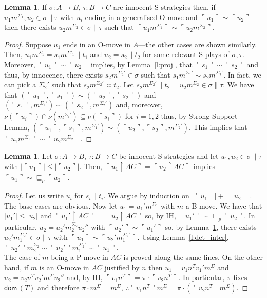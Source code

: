 \documentclass{CSML}
\theoremstyle{definition}\newtheorem{definition}[thm]{Definition}
\theoremstyle{definition}\newtheorem{example}[thm]{Example}
\theoremstyle{definition}\newtheorem{proposition}[thm]{Proposition}
\theoremstyle{definition}\newtheorem{lemma}[thm]{Lemma}
\theoremstyle{definition}\newtheorem{theorem}[thm]{Theorem}
\theoremstyle{definition}\newtheorem{corollary}[thm]{Corollary}
\theoremstyle{definition}\newtheorem{remark}[thm]{Remark}
\renewcommand\Sigma{\varSigma}
\newcommand\Tau{T}
\newcommand\arr{\rightarrow}
\newcommand\rest{\upharpoonright}
\newcommand\iseq{\mathop{\|}}
\newcommand\actn{\cdot}
\newcommand{\HY}{\hspace{2pt}---\hspace{2pt}}
\newcommand\dom[1]{\mathsf{dom}\,#1}
\newcommand\prefix{\sqsubseteq_p}
\newcommand\pview[1]{\ulcorner{#1}\urcorner}
\newcommand\pv[1]{\pview{#1}}
\begin{document}
\begin{lemma}\label{l:inn_inter}
If $\sigma:A\arr B$, $\tau:B\arr C$ are innocent S-strategies then, if $u_1m^{\Sigma_1},u_2\in\sigma\iseq\tau$ with $u_i$ ending in a generalised O-move and $\pv{u_1}\sim\pv{u_2}$ then there exists $u_2m^{\Sigma_2}\in\sigma\iseq\tau$ such that $\pv{u_1m^{\Sigma_1}}\sim\pv{u_2m^{\Sigma_2}}$.
\end{lemma}
\begin{proof}
Suppose $u_1$ ends in an O-move in $A$\HY the other cases are shown similarly. Then, $u_1m^{\Sigma_1}=s_1 m^{\Sigma'_1}\iseq t_1$ and $u_2=s_2\iseq t_2$ for some relevant S-plays of $\sigma,\tau$. Moreover, $\pv{u_1}\sim\pv{u_2}$ implies, by Lemma~\ref{l:proj}, that $\pv{s_1}\sim\pv{s_2}$ and thus, by innocence, there exists $s_2m^{\Sigma_2'}\in\sigma$ such that $s_1m^{\Sigma_1'}\sim s_2m^{\Sigma_2'}$. In fact, we can pick a $\Sigma_2'$ such that $s_2m^{\Sigma_2'}\asymp t_2$. Let $s_2m^{\Sigma_2'}\iseq t_2=u_2m^{\Sigma_2}\in\sigma\iseq\tau$. We have that $(\pv{u_1},\pv{s_1})\sim(\pv{u_2},\pv{s_2})$ and $(\pv{s_1},m^{\Sigma_1'})\sim(\pv{s_2},m^{\Sigma_2'})$ and, moreover, $\nu(\pv{u_i})\cap\nu(m^{\Sigma_i'})\subseteq\nu(\pv{s_i})$ for $i=1,2$ thus, by Strong Support Lemma, $(\pv{u_1},\pv{s_1},m^{\Sigma_1'})\sim(\pv{u_2},\pv{s_2},m^{\Sigma_2'})$. This implies that $\pv{u_1m^{\Sigma_1}}\sim\pv{u_2m^{\Sigma_2}}$.
\end{proof}

\begin{lemma}\label{l:inn_other}
Let $\sigma:A\arr B$, $\tau:B\arr C$ be innocent S-strategies and let $u_1,u_2\in\sigma\iseq\tau$ with $|\pv{u_1}|\leq|\pv{u_2}|$. Then, $\pv{u_1\rest AC}=\pv{u_2\rest AC}$  implies $\pv{u_1}\sim\prefix\pv{u_2}$.
\end{lemma}
\begin{proof}
Let us write $u_i$ for $s_i\iseq t_i$.
We argue by induction on $|\pv{u_1}|+|\pv{u_2}|$. The base cases are obvious.  Now let $u_1=u_1'm^{\Sigma_1}$ with $m$ a B-move. We have that $|u_1'|\leq|u_2|$ and $\pv{u_1'\rest AC}=\pv{u_2\rest AC}$ so, by IH, $\pv{u_1'}\sim\prefix\pv{u_2}$. In particular, $u_2=u_2'm_2^{\Sigma_2}u_2''$ with $\pv{u_2'}\sim\pv{u_1'}$ so, by Lemma~\ref{l:inn_inter}, there exists $u_2'm_1^{\Sigma_2'}\in\sigma\iseq\tau$ with $\pv{u_1}\sim\pv{u_2'm_1^{\Sigma_2'}}$. Using Lemma~\ref{l:det_inter}, $\pv{u_2'}m_2^{\Sigma_2}\sim \pv{u_2'}m_1^{\Sigma_2'}\sim \pv{u_1}$.\\
The case of $m$ being a P-move in $AC$ is proved along the same lines. On the other hand, if $m$ is an O-move in $AC$ justified by $n$ then $u_1=v_1n^\Tau v_1'm^\Sigma$ and $u_2=v_2n^\Tau v_2'm^\Sigma v_2''$ and, by IH, $\pv{v_1n^\Tau}=\pi\actn\pv{v_2n^\Tau}$. In particular, $\pi$ fixes $\dom(\Tau)$ and therefore $\pi\actn m^\Sigma=m^\Sigma$, $\therefore\pv{v_1n^\Tau}m^\Sigma=\pi\actn(\pv{v_2n^\Tau}m^\Sigma)$.
\end{proof}
\end{document}
